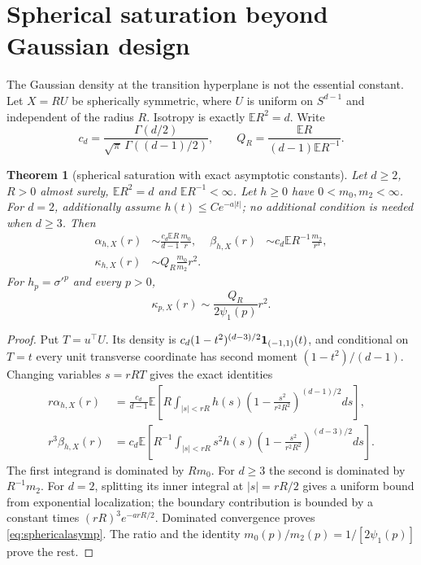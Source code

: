 \documentclass[11pt]{article}
\newtheorem{theorem}{Theorem}[section]
\newcommand{\E}{\mathbb E}
\begin{document}
\section{Spherical saturation beyond Gaussian design}
\label{sec:global-spherical}

The Gaussian density at the transition hyperplane is not the essential constant.  Let $X=RU$ be spherically
symmetric, where $U$ is uniform on $S^{d-1}$ and independent of the radius $R$.  Isotropy is exactly
$\E R^2=d$.  Write
\[
 c_d=\frac{\Gamma(d/2)}{\sqrt\pi\,\Gamma((d-1)/2)},\qquad
 Q_R=\frac{\E R}{(d-1)\E R^{-1}}.
\]

\begin{theorem}[spherical saturation with exact asymptotic constants]
\label{thm:globalspherical}
Let $d\ge2$, $R>0$ almost surely, $\E R^2=d$ and $\E R^{-1}<\infty$.  Let $h\ge0$ have
$0<m_0,m_2<\infty$.  For $d=2$, additionally assume $h(t)\le Ce^{-a|t|}$; no additional condition is needed
when $d\ge3$.  Then
\begin{align}
 \alpha_{h,X}(r)&\sim \frac{c_d\E R}{d-1}\frac{m_0}{r},&
 \beta_{h,X}(r)&\sim c_d\E R^{-1}\frac{m_2}{r^3},\label{eq:sphericalasymp}\\
 \kappa_{h,X}(r)&\sim Q_R\frac{m_0}{m_2}r^2.\label{eq:sphericalkappa}
\end{align}
For $h_p=\sigma'^p$ and every $p>0$,
\begin{equation}
 \kappa_{p,X}(r)\sim\frac{Q_R}{2\psi_1(p)}r^2.
 \label{eq:sphericallogistic}
\end{equation}
\end{theorem}

\begin{proof}
Put $T=u^\top U$.  Its density is
$c_d(1-t^2)^{(d-3)/2}{\bf1}_{(-1,1)}(t)$, and conditional on $T=t$ every unit transverse coordinate has second
moment $(1-t^2)/(d-1)$.  Changing variables $s=rRT$ gives the exact identities
\begin{align}
 r\alpha_{h,X}(r)
 &=\frac{c_d}{d-1}\E\!\left[R\!\int_{|s|<rR}\!h(s)
 \left(1-\frac{s^2}{r^2R^2}\right)^{(d-1)/2}ds\right],\label{eq:sphericalexacta}\\
 r^3\beta_{h,X}(r)
 &=c_d\E\!\left[R^{-1}\!\int_{|s|<rR}\!s^2h(s)
 \left(1-\frac{s^2}{r^2R^2}\right)^{(d-3)/2}ds\right].\label{eq:sphericalexactb}
\end{align}
The first integrand is dominated by $Rm_0$.  For $d\ge3$ the second is dominated by $R^{-1}m_2$.
For $d=2$, splitting its inner integral at $|s|=rR/2$ gives a uniform bound from exponential localization;
the boundary contribution is bounded by a constant times $(rR)^3e^{-arR/2}$.  Dominated convergence proves
\eqref{eq:sphericalasymp}.  The ratio and the identity $m_0(p)/m_2(p)=1/[2\psi_1(p)]$ prove the rest.
\end{proof}
\end{document}
